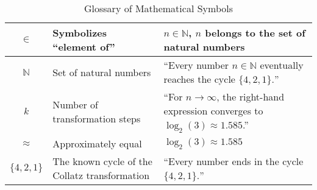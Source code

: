 \documentclass[a4paper,12pt]{article}
\begin{document}
\begin{table}[h!]
\begin{tabular}{|c|p{7cm}|p{5cm}|}
\( \in \) & Symbolizes “element of” & \( n \in \mathbb{N} \), \( n \) belongs to the set of natural numbers \\ \hline
\( \mathbb{N} \) & Set of natural numbers & “Every number \( n \in \mathbb{N} \) eventually reaches the cycle \( \{4, 2, 1\}. \)” \\ \hline
\( k \) & Number of transformation steps & “For \( n \to \infty \), the right-hand expression converges to \( \log_2(3) \approx 1.585 \).” \\ \hline
\( \approx \) & Approximately equal & \( \log_2(3) \approx 1.585 \) \\ \hline
\( \{4, 2, 1\} \) & The known cycle of the Collatz transformation & “Every number ends in the cycle \( \{4, 2, 1\}. \)” \\ \hline
\end{tabular}
\caption{Glossary of Mathematical Symbols}
\label{tab:glossary}
\end{table}
\end{document}
